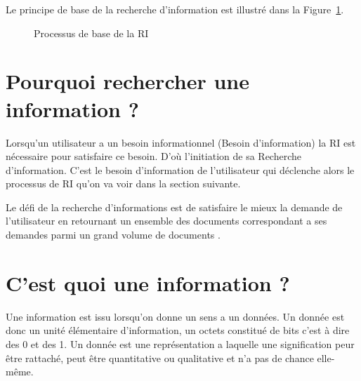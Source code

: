 Le principe de base de la recherche d'information est illustré dans la Figure~\ref{fig:processus-ri}.

\begin{figure}[htbp]
    \begin{center}
    \end{center}
    \caption{Processus de base de la RI \citep{amelioration-ri-approche-semantique}}
    \label{fig:processus-ri}
\end{figure}

\section{Pourquoi rechercher une information ?}
Lorsqu'un utilisateur a un besoin informationnel (Besoin d'information) la RI est nécessaire pour satisfaire ce besoin. D'où l'initiation de sa Recherche d'information. C'est le besoin d'information de l'utilisateur qui déclenche alors le processus de RI qu'on va voir dans la section suivante.

Le défi de la recherche d'informations est de satisfaire le mieux la demande de l'utilisateur en retournant un ensemble des documents correspondant a ses demandes parmi un grand volume de documents \citep{amelioration-ri-approche-semantique}.

\section{C'est quoi une information ?}
Une information est issu lorsqu'on donne un sens a un données. Un donnée est donc un unité élémentaire d'information, un octets constitué de bits c'est à dire des 0 et des 1. Un donnée est une représentation a laquelle une signification peur être rattaché, peut être quantitative ou qualitative et n'a pas de chance elle-même.

